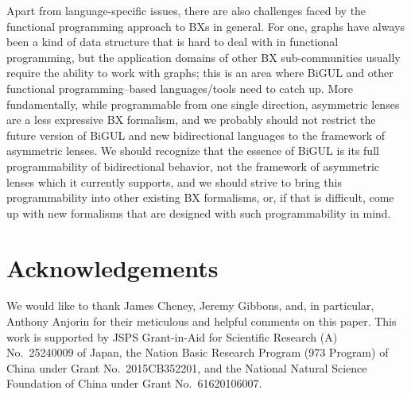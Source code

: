 Apart from language-specific issues, there are also challenges faced by the functional programming approach to BXs in general.
For one, graphs have always been a kind of data structure that is hard to deal with in functional programming, but the application domains of other BX sub-communities usually require the ability to work with graphs; this is an area where BiGUL and other functional programming--based languages/tools need to catch up.
More fundamentally, while programmable from one single direction, asymmetric lenses are a less expressive BX formalism, and we probably should not restrict the future version of BiGUL and new bidirectional languages to the framework of asymmetric lenses.
We should recognize that the essence of BiGUL is its full programmability of bidirectional behavior, not the framework of asymmetric lenses which it currently supports, and we should strive to bring this programmability into other existing BX formalisms, or, if that is difficult, come up with new formalisms that are designed with such programmability in mind.

\section*{Acknowledgements}

We would like to thank James Cheney, Jeremy Gibbons, and, in particular, \hbox{Anthony} \hbox{Anjorin}
for their meticulous and helpful comments on this paper. 
This work is supported by JSPS Grant-in-Aid for Scientific Research
(A) No.~25240009 of Japan, the Nation Basic Research Program (973
Program) of China under Grant No.~2015CB352201, and the National
Natural Science Foundation of China under Grant No.~61620106007.
